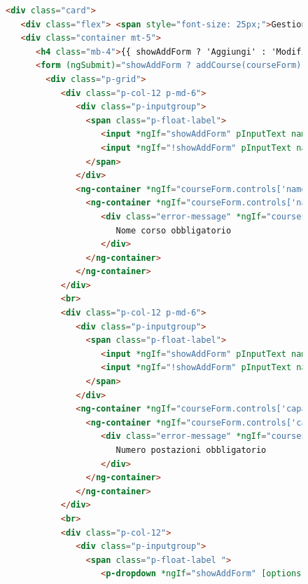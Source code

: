 \begin{figure}[H]
\centering
\begin{lstlisting}[language=HTML, linewidth=20cm, basicstyle=\tiny]
<div class="card">
   <div class="flex"> <span style="font-size: 25px;">Gestione corsi (Admin)</span> </div>
   <div class="container mt-5">
      <h4 class="mb-4">{{ showAddForm ? 'Aggiungi' : 'Modifica' }} corso</h4>
      <form (ngSubmit)="showAddForm ? addCourse(courseForm) : updateCoursesData(courseForm)" #courseForm="ngForm">
        <div class="p-grid">
           <div class="p-col-12 p-md-6">
              <div class="p-inputgroup">
                <span class="p-float-label">
                   <input *ngIf="showAddForm" pInputText name="name" [(ngModel)]="course.coursesName" required>
                   <input *ngIf="!showAddForm" pInputText name="name" [(ngModel)]="editedCourse.coursesName" required> <label>Nome corso</label>
                </span>
              </div>
              <ng-container *ngIf="courseForm.controls['name']">
                <ng-container *ngIf="courseForm.controls['name'].invalid && (courseForm.controls['name'].dirty || courseForm.controls['name']        .touched)">
                   <div class="error-message" *ngIf="courseForm.controls['name'].errors.required">
                      Nome corso obbligatorio
                   </div>
                </ng-container>
              </ng-container>
           </div>
           <br>
           <div class="p-col-12 p-md-6">
              <div class="p-inputgroup">
                <span class="p-float-label">
                   <input *ngIf="showAddForm" pInputText name="capacity" [(ngModel)]="course.coursesCapacity" required>
                   <input *ngIf="!showAddForm" pInputText name="capacity" [(ngModel)]="editedCourse.coursesCapacity" required> <label>Numero postazioni</label>
                </span>
              </div>
              <ng-container *ngIf="courseForm.controls['capacity']">
                <ng-container *ngIf="courseForm.controls['capacity'].invalid && (courseForm.controls['capacity'].dirty || courseForm.controls['capacity'].touched)">
                   <div class="error-message" *ngIf="courseForm.controls['capacity'] .errors.required">
                      Numero postazioni obbligatorio
                   </div>
                </ng-container>
              </ng-container>
           </div>
           <br>
           <div class="p-col-12">
              <div class="p-inputgroup">
                <span class="p-float-label ">
                   <p-dropdown *ngIf="showAddForm" [options]="types" [(ngModel)]="selectedType" placeholder="Seleziona tiopologia corso"              optionLabel = "types" name="types" [style]="{ 'width': '100%' }" required></p-dropdown>

\end{lstlisting}
\end{figure}
